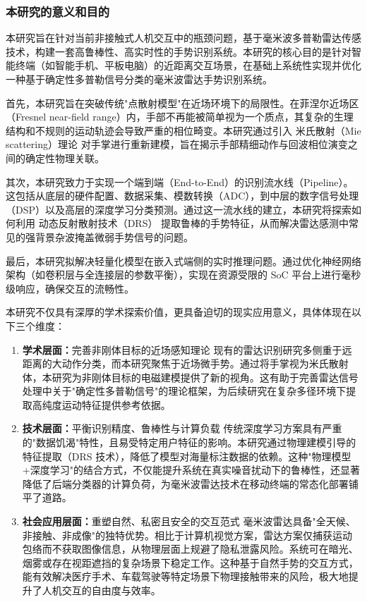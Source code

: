 \subsubsection{本研究的意义和目的}
本研究旨在针对当前非接触式人机交互中的瓶颈问题，基于毫米波多普勒雷达传感技术，构建一套高鲁棒性、高实时性的手势识别系统。本研究的核心目的是针对智能终端（如智能手机、平板电脑）的近距离交互场景，在基础上系统性实现并优化一种基于确定性多普勒信号分类的毫米波雷达手势识别系统。

首先，本研究旨在突破传统"点散射模型"在近场环境下的局限性。在菲涅尔近场区（Fresnel near-field range）内，手部不再能被简单视为一个质点，其复杂的生理结构和不规则的运动轨迹会导致严重的相位畸变\cite{mainpaper}。本研究通过引入 米氏散射（Mie scattering）理论 对手掌进行重新建模，旨在揭示手部精细动作与回波相位演变之间的确定性物理关联。

其次，本研究致力于实现一个端到端（End-to-End）的识别流水线（Pipeline）。这包括从底层的硬件配置、数据采集、模数转换（ADC），到中层的数字信号处理（DSP）以及高层的深度学习分类预测。通过这一流水线的建立，本研究将探索如何利用 动态反射散射技术（DRS） 提取鲁棒的手势特征，从而解决雷达感测中常见的强背景杂波掩盖微弱手势信号的问题。

最后，本研究拟解决轻量化模型在嵌入式端侧的实时推理问题。通过优化神经网络架构（如卷积层与全连接层的参数平衡），实现在资源受限的 SoC 平台上进行毫秒级响应，确保交互的流畅性。

本研究不仅具有深厚的学术探索价值，更具备迫切的现实应用意义，具体体现在以下三个维度：
\begin{enumerate}
    \item \textbf{学术层面：}完善非刚体目标的近场感知理论 现有的雷达识别研究多侧重于远距离的大动作分类，而本研究聚焦于近场微手势。通过将手掌视为米氏散射体，本研究为非刚体目标的电磁建模提供了新的视角。这有助于完善雷达信号处理中关于"确定性多普勒信号"的理论框架，为后续研究在复杂多径环境下提取高纯度运动特征提供参考依据。
    \item \textbf{技术层面：}平衡识别精度、鲁棒性与计算负载 传统深度学习方案具有严重的"数据饥渴"特性，且易受特定用户特征的影响。本研究通过物理建模引导的特征提取（DRS 技术），降低了模型对海量标注数据的依赖。这种"物理模型+深度学习"的结合方式，不仅能提升系统在真实噪音扰动下的鲁棒性，还显著降低了后端分类器的计算负荷，为毫米波雷达技术在移动终端的常态化部署铺平了道路。
    \item \textbf{社会应用层面：}重塑自然、私密且安全的交互范式 毫米波雷达具备"全天候、非接触、非成像"的独特优势。相比于计算机视觉方案，雷达方案仅捕获运动包络而不获取图像信息，从物理层面上规避了隐私泄露风险。系统可在暗光、烟雾或存在视距遮挡的复杂场景下稳定工作。这种基于自然手势的交互方式，能有效解决医疗手术、车载驾驶等特定场景下物理接触带来的风险，极大地提升了人机交互的自由度与效率。
\end{enumerate}

